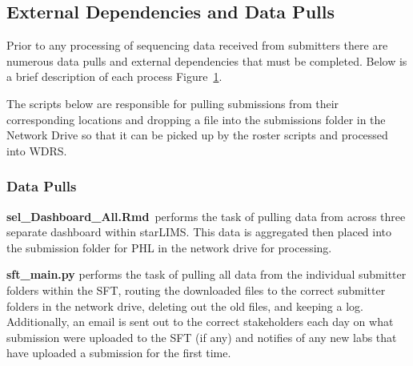 \documentclass[
  letterpaper,
  DIV=11,
  numbers=noendperiod]{scrartcl}
\begin{document}
\subsection{External Dependencies and Data
Pulls}\label{external-dependencies-and-data-pulls}

Prior to any processing of sequencing data received from submitters
there are numerous data pulls and external dependencies that must be
completed. Below is a brief description of each process
Figure~\ref{fig-pulls}.

\begin{figure}[H]


\caption{\label{fig-pulls}}

\end{figure}%

The scripts below are responsible for pulling submissions from their
corresponding locations and dropping a file into the submissions folder
in the Network Drive so that it can be picked up by the roster scripts
and processed into WDRS.

\subsubsection{Data Pulls}\label{data-pulls}

\textbf{sel\_Dashboard\_All.Rmd}~performs the task of pulling data from
across three separate dashboard within starLIMS. This data is aggregated
then placed into the submission folder for PHL in the network drive for
processing.

\textbf{sft\_main.py} performs the task of pulling all data from the
individual submitter folders within the SFT, routing the downloaded
files to the correct submitter folders in the network drive, deleting
out the old files, and keeping a log. Additionally, an email is sent out
to the correct stakeholders each day on what submission were uploaded to
the SFT (if any) and notifies of any new labs that have uploaded a
submission for the first time.
\end{document}
